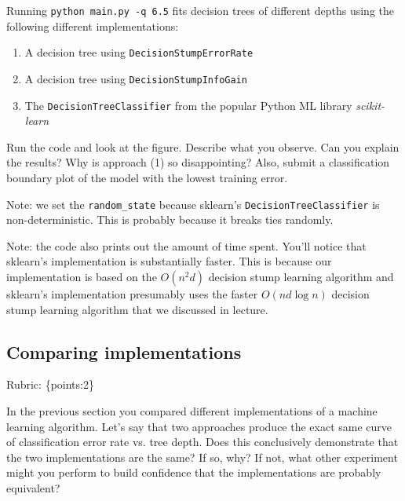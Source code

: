 \documentclass{article}
\def\rubric#1{\gre{Rubric: \{#1\}}}{}
\def\blu#1{{\color{blu}#1}}
\def\gre#1{{\color{gre}#1}}
\begin{document}
	Running \texttt{python main.py -q 6.5} fits decision trees of different depths using the following different implementations:
	\begin{enumerate}
		\item A decision tree using \texttt{DecisionStumpErrorRate}
		\item A decision tree using \texttt{DecisionStumpInfoGain}
		\item The \texttt{DecisionTreeClassifier} from the popular Python ML library \emph{scikit-learn}
	\end{enumerate}

	Run the code and look at the figure.
	\blu{Describe what you observe. Can you explain the results?} Why is approach (1) so disappointing? Also, \blu{submit a classification boundary plot of the model with the lowest training error}.

	Note: we set the \verb|random_state| because sklearn's \texttt{DecisionTreeClassifier} is non-deterministic. This is probably
	because it breaks ties randomly.

	Note: the code also prints out the amount of time spent. You'll notice that sklearn's implementation is substantially faster. This is because
	our implementation is based on the $O(n^2d)$ decision stump learning algorithm and sklearn's implementation presumably uses the faster $O(nd\log n)$
	decision stump learning algorithm that we discussed in lecture.


	\subsection{Comparing implementations}
	\rubric{points:2}

	In the previous section you compared different implementations of a machine learning algorithm. Let's say that two
	approaches produce the exact same curve of classification error rate vs. tree depth. Does this conclusively demonstrate
	that the two implementations are the same? If so, why? If not, what other experiment might you perform to build confidence
	that the implementations are probably equivalent?
\end{document}
